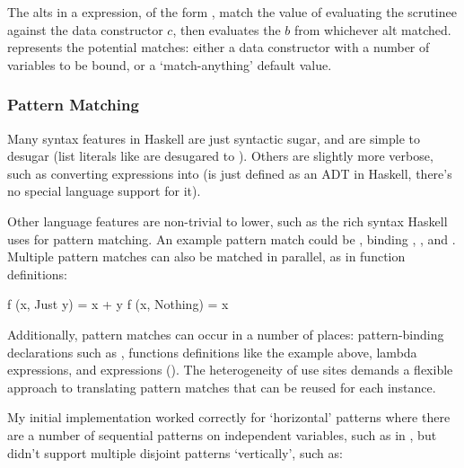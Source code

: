 \documentclass[dissertation.tex]{subfiles}
\begin{document}
{{{\begin{itemize}
{                The alts in a  expression, of the form , match the value
                of evaluating the scrutinee against the data constructor \(c\), then evaluates the \(b\) from
                whichever alt matched.  represents the potential matches: either a data
                constructor with a number of variables to be bound, or a `match-anything' default value.

            }
            \end{itemize}
        }
        \subsubsection{Pattern Matching}
        {

            Many syntax features in Haskell are just syntactic sugar, and are simple to desugar (list literals like
            \haskell{[1, 2]} are desugared to ). Others are slightly more verbose, such as converting  expressions into 
            (is just defined as an ADT in Haskell, there's no special language support for it).

            Other language features are non-trivial to lower, such as the rich syntax Haskell uses for pattern
            matching. An example pattern match could be , binding , , and . Multiple pattern matches can also be matched in
            parallel, as in function definitions:

            \begin{haskellfigure}
            f (x, Just y) = x + y
            f (x, Nothing) = x
            \end{haskellfigure}

            Additionally, pattern matches can occur in a number of places: pattern-binding declarations such as
            , functions definitions like the example above, lambda expressions, and
             expressions (). The
            heterogeneity of use sites demands a flexible approach to translating pattern matches that can be reused
            for each instance.

            My initial implementation worked correctly for `horizontal' patterns where there are a number of
            sequential patterns on independent variables, such as in , but didn't
            support multiple disjoint patterns `vertically', such as:

}}}
\end{document}
